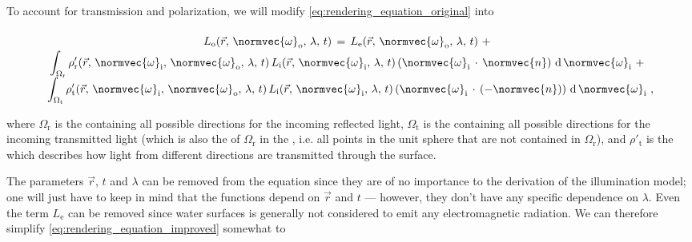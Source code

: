 {To account for transmission and polarization, we will modify \eqref{eq:rendering_equation_original} into

\begin{equation} \label{eq:rendering_equation_improved}
\renewcommand*{\arraystretch}{1.5}
\begin{array}{cl}
L_{\text{o}}(\vec{r},\,\normvec{\omega}_{\text{o}},\, \lambda,\, t) \,=\, L_{\text{e}}(\vec{r},\, \normvec{\omega}_{\text{o}},\, \lambda,\, t) \ + \\
\displaystyle \int_{\Omega_{\text{r}}} \rho'_{\text{r}}(\vec{r},\, \normvec{\omega}_{\text{i}},\, \normvec{\omega}_{\text{o}},\, \lambda,\, t)\, L_{\text{i}}(\vec{r},\, \normvec{\omega}_{\text{i}},\, \lambda,\, t)\, (\normvec{\omega}_{\text{i}}\,\cdot\,\normvec{n})\, \operatorname d \normvec{\omega}_{\text{i}} \ + \\
\displaystyle \int_{\Omega_{\text{t}}} \rho'_{\text{t}}(\vec{r},\, \normvec{\omega}_{\text{i}},\, \normvec{\omega}_{\text{o}},\, \lambda,\, t)\, L_{\text{i}}(\vec{r},\, \normvec{\omega}_{\text{i}},\, \lambda,\, t)\, (\normvec{\omega}_{\text{i}}\,\cdot\,(-\normvec{n}))\, \operatorname d \normvec{\omega}_{\text{i}} & \!\!\!\! ,
\end{array}
\end{equation}

where $\Omega_{\text{r}}$ is the  containing all possible directions for the incoming reflected light, $\Omega_{\text{t}}$ is the  containing all possible directions for the incoming transmitted light (which is also the  of $\Omega_{\text{r}}$ in the , i.e. all points in the unit sphere that are not contained in $\Omega_{\text{r}}$), and $\rho'_{\text{t}}$ is the \BTDF which describes how light from different directions are transmitted through the surface.

The parameters $\vec{r}$, $t$ and $\lambda$ can be removed from the equation since they are of no importance to the derivation of the illumination model; one will just have to keep in mind that the functions depend on $\vec{r}$ and $t$ --- however, they don't have any specific dependence on $\lambda$. Even the term $L_{\text{e}}$ can be removed since water surfaces is generally not considered to emit any electromagnetic radiation. We can therefore simplify \eqref{eq:rendering_equation_improved} somewhat to

}
